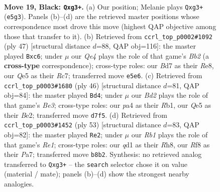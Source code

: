 \documentclass[11pt]{article}
\begin{document}
\clearpage

\begin{figure}[p]\centering
\begin{subfigure}{0.46\textwidth}\centering
\resizebox{\linewidth}{!}{%
\newchessgame
\chessboard[
  setfen={1r3rk1/p2b1pb1/2pp4/4q2p/P1PNp2P/4B1P1/8/R2QK2R b KQ - 1 19},
  showmover=false,
  pgfstyle=straightmove, color=movearrow, markmove={e5-g3}
]}
\caption{}
\end{subfigure}\hfill
\begin{subfigure}{0.46\textwidth}\centering
\resizebox{\linewidth}{!}{%
\newchessgame
\chessboard[
  setfen={4r1k1/pbrq1p1p/p1N3p1/3P4/3Q4/5PP1/P1R3P1/3R2K1 b - - 0 24},
  showmover=false,
  pgfstyle=straightmove, color=movearrow, markmove={b7-c6}
]}
\caption{}
\end{subfigure}
\\[4pt]
\begin{subfigure}{0.46\textwidth}\centering
\resizebox{\linewidth}{!}{%
\newchessgame
\chessboard[
  setfen={r2r2k1/3qpp1p/p5pb/4P3/2p2P2/2PnB3/P1Q1B1PP/1R3RK1 w - - 1 24},
  showmover=false,
  pgfstyle=straightmove, color=movearrow, markmove={e3-d4}
]}
\caption{}
\end{subfigure}\hfill
\begin{subfigure}{0.46\textwidth}\centering
\resizebox{\linewidth}{!}{%
\newchessgame
\chessboard[
  setfen={2b1r2r/ppk2p2/2pq4/P1Np1p1P/1Q1P4/5R2/1PP5/1K5R b - - 0 27},
  showmover=false,
  pgfstyle=straightmove, color=movearrow, markmove={e8-e2}
]}
\caption{}
\end{subfigure}
\caption{\textbf{Move 19, Black: \texttt{Qxg3+}.} (a) Our position; Melanie plays \texttt{Qxg3+} (\texttt{e5g3}). Panels (b)--(d) are the retrieved master positions whose correspondence most drove this move (highest QAP objective among those that transfer to it). (b) Retrieved from \texttt{ccrl\_top\_p0002\#1092} (ply 47) [structural distance $d$=88, QAP obj=116]: the master played \texttt{Bxc6}; under $\mu$ our \emph{Qe4} plays the role of that game's \emph{Bb2} (a \textbf{cross-type} correspondence); cross-type roles: our \emph{B}d7 as their \emph{R}e8, our \emph{Q}e5 as their \emph{R}c7; transferred move \texttt{e5e6}. (c) Retrieved from \texttt{ccrl\_top\_p0003\#1680} (ply 46) [structural distance $d$=81, QAP obj=84]: the master played \texttt{Bd4}; under $\mu$ our \emph{Bd2} plays the role of that game's \emph{Be3}; cross-type roles: our \emph{p}a4 as their \emph{R}b1, our \emph{Q}e5 as their \emph{B}e2; transferred move \texttt{d7f5}. (d) Retrieved from \texttt{ccrl\_top\_p0003\#1452} (ply 53) [structural distance $d$=83, QAP obj=82]: the master played \texttt{Re2}; under $\mu$ our \emph{Rb1} plays the role of that game's \emph{Re1}; cross-type roles: our \emph{q}d1 as their \emph{R}h8, our \emph{R}f8 as their \emph{P}a7; transferred move \texttt{b8b2}. Synthesis: no retrieved analog transferred to \texttt{Qxg3+} -- the \texttt{search} selector chose it on value (material / mate); panels (b)--(d) show the strongest nearby analogies.}
\label{fig:thought-m37}
\end{figure}
\end{document}

